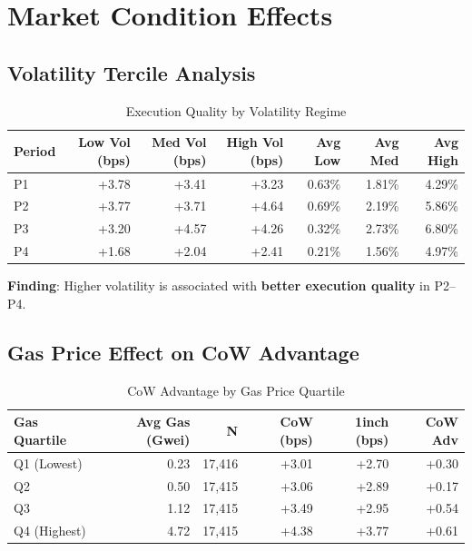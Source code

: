 \documentclass[11pt,a4paper]{article}
\begin{document}
\section{Market Condition Effects}

\subsection{Volatility Tercile Analysis}

\begin{table}[H]
\centering
\caption{Execution Quality by Volatility Regime}
\begin{tabular}{lrrrrrr}
\toprule
\textbf{Period} & \textbf{Low Vol (bps)} & \textbf{Med Vol (bps)} & \textbf{High Vol (bps)} & \textbf{Avg Low} & \textbf{Avg Med} & \textbf{Avg High} \\
\midrule
P1 & +3.78 & +3.41 & +3.23 & 0.63\% & 1.81\% & 4.29\% \\
P2 & +3.77 & +3.71 & +4.64 & 0.69\% & 2.19\% & 5.86\% \\
P3 & +3.20 & +4.57 & +4.26 & 0.32\% & 2.73\% & 6.80\% \\
P4 & +1.68 & +2.04 & +2.41 & 0.21\% & 1.56\% & 4.97\% \\
\bottomrule
\end{tabular}
\end{table}

\textbf{Finding}: Higher volatility is associated with \textbf{better execution quality} in P2--P4.

\subsection{Gas Price Effect on CoW Advantage}

\begin{table}[H]
\centering
\caption{CoW Advantage by Gas Price Quartile}
\begin{tabular}{lrrrrr}
\toprule
\textbf{Gas Quartile} & \textbf{Avg Gas (Gwei)} & \textbf{N} & \textbf{CoW (bps)} & \textbf{1inch (bps)} & \textbf{CoW Adv} \\
\midrule
Q1 (Lowest) & 0.23 & 17,416 & +3.01 & +2.70 & +0.30 \\
Q2 & 0.50 & 17,415 & +3.06 & +2.89 & +0.17 \\
Q3 & 1.12 & 17,415 & +3.49 & +2.95 & +0.54 \\
Q4 (Highest) & 4.72 & 17,415 & +4.38 & +3.77 & +0.61 \\
\bottomrule
\end{tabular}
\end{table}
\end{document}
